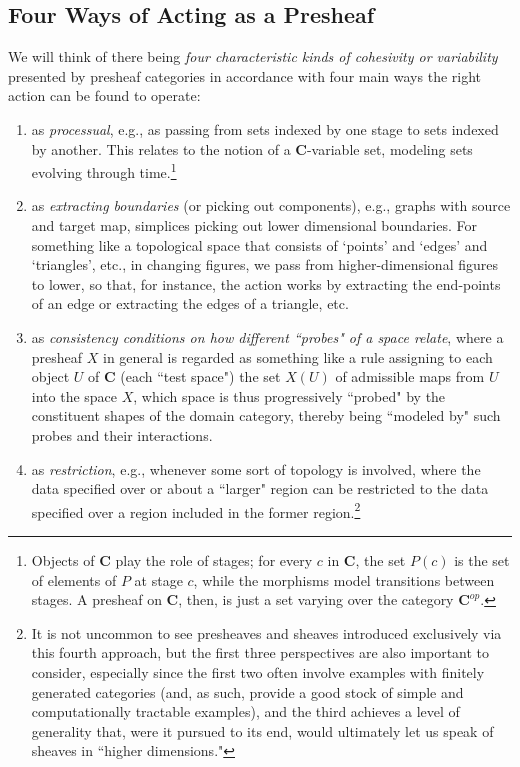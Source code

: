 \documentclass[a4paper]{book}
\theoremstyle{definition}
\theoremstyle{definition}
\theoremstyle{definition}
\theoremstyle{theorem}
\theoremstyle{definition}
\begin{document}
\subsection{Four Ways of Acting as a Presheaf} 
We will think of there being \textit{four characteristic kinds of cohesivity or variability} presented by presheaf categories in accordance with four main ways the right action can be found to operate:
\begin{enumerate}  
\item as \textit{processual}, e.g., as passing from sets indexed by one stage to sets indexed by another. This relates to the notion of a \textbf{C}-variable set, modeling sets evolving through time.\footnote{{Objects of \textbf{C} play the role of stages; for every $c$ in \textbf{C}, the set $P(c)$ is the set of elements of $P$ at stage $c$, while the morphisms model transitions between stages. A presheaf on \textbf{C}, then, is just a set varying over the category $\textbf{C}^{op}$.}} 
\item as \textit{extracting boundaries} (or picking out components), e.g., graphs with source and target map, simplices picking out lower dimensional boundaries. For something like a topological space that consists of `points' and `edges' and `triangles', etc., in changing figures, we pass from higher-dimensional figures to lower, so that, for instance, the action works by extracting the end-points of an edge or extracting the edges of a triangle, etc.   
\item as \textit{consistency conditions on how different ``probes" of a space relate}, where a presheaf $X$ in general is regarded as something like a rule assigning to each object $U$ of $\textbf{C}$ (each ``test space") the set $X(U)$ of admissible maps from $U$ into the space $X$, which space is thus progressively ``probed" by the constituent shapes of the domain category, thereby being ``modeled by" such probes and their interactions.     
\item as \textit{restriction}, e.g., whenever some sort of topology is involved, where the data specified over or about a ``larger" region can be restricted to the data specified over a region included in the former region.\footnote{It is not uncommon to see presheaves and sheaves introduced exclusively via this fourth approach, but the first three perspectives are also important to consider, especially since the first two often involve examples with finitely generated categories (and, as such, provide a good stock of simple and computationally tractable examples), and the third achieves a level of generality that, were it pursued to its end, would ultimately let us speak of sheaves in ``higher dimensions."} 
\end{enumerate} 
\end{document}

